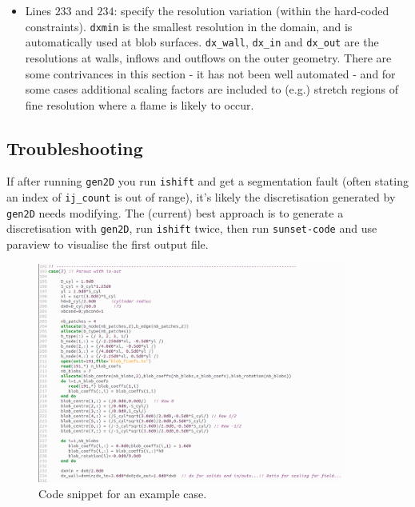 \documentclass[notitlepage]{revtex4-1}
\begin{document}
\begin{itemize}
\item Lines $233$ and $234$: specify the resolution variation (within the hard-coded constraints). \verb|dxmin| is the smallest resolution in the domain, and is automatically used at blob surfaces. \verb|dx_wall|, \verb|dx_in| and \verb|dx_out| are the resolutions at walls, inflows and outflows on the outer geometry. There are some contrivances in this section - it has not been well automated - and for some cases additional scaling factors are included to (e.g.) stretch regions of fine resolution where a flame is likely to occur.
\end{itemize}

\subsection{Troubleshooting}

If after running \verb|gen2D| you run \verb|ishift| and get a segmentation fault (often stating an index of \verb|ij_count| is out of range), it's likely the discretisation generated by \verb|gen2D| needs modifying. The (current) best approach is to generate a discretisation with \verb|gen2D|, run \verb|ishift| twice, then run \verb|sunset-code| and use paraview to visualise the first output file.

\begin{figure}
\includegraphics[width=0.9\textwidth]{case7.png}
\caption{Code snippet for an example case.\label{fig:case7}}
\end{figure}


%

\end{document}
